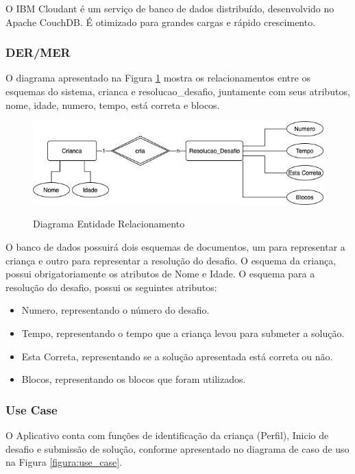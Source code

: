         O IBM Cloudant é um serviço de banco de dados distribuído, desenvolvido no Apache CouchDB. É otimizado para grandes cargas e rápido crescimento.
        
        \subsubsection{DER/MER}
        O diagrama apresentado na Figura \ref{figura:der_mer} mostra os relacionamentos entre os esquemas do sistema, crianca e resolucao\_desafio, juntamente com seus atributos, nome, idade, numero, tempo, está correta e blocos.
        
        \begin{figure}[H]
            \caption{Diagrama Entidade Relacionamento}
            \centering
            \includegraphics[width=\linewidth]{Imagens/Cap3/MER_DER.jpg}
            \label{figura:der_mer}
        \end{figure}
        
        O banco de dados possuirá dois esquemas de documentos, um para representar a criança e outro para representar a resolução do desafio.
        O esquema da criança, possui obrigatoriamente os atributos de Nome e Idade.
        O esquema para a resolução do desafio, possui os seguintes atributos:
        
        \begin{itemize}
            \item Numero, representando o número do desafio.
            \item Tempo, representando o tempo que a criança levou para submeter a solução.
            \item Esta Correta, representando se a solução apresentada está correta ou não.
            \item Blocos, representando os blocos que foram utilizados.
        \end{itemize} 
        
        \subsubsection{Use Case}
        O Aplicativo conta com funções de identificação da criança (Perfil), Inicio de desafio e submissão de solução, conforme apresentado no diagrama de caso de uso na Figura \ref{figura:use_case}.
        
